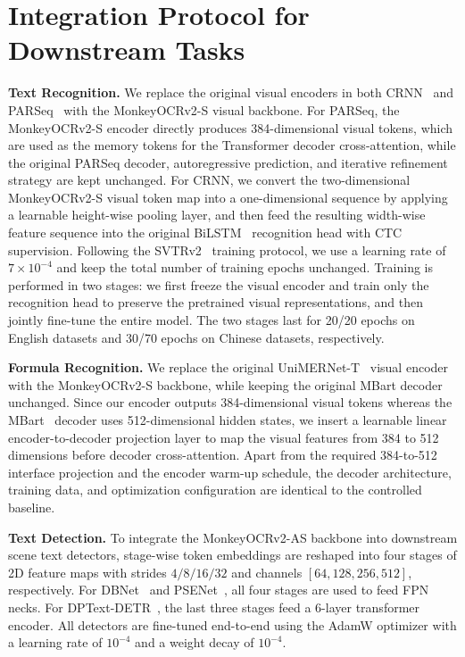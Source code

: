 \documentclass{article}
\begin{document}
\section{Integration Protocol for Downstream Tasks}
\label{sec:appendix_integration}
\textbf{Text Recognition.} We replace the original visual encoders in both CRNN~\cite{crnn} and PARSeq~\cite{parseq} with the MonkeyOCRv2-S visual backbone. For PARSeq, the MonkeyOCRv2-S encoder directly produces 384-dimensional visual tokens, which are used as the memory tokens for the Transformer decoder cross-attention, while the original PARSeq decoder, autoregressive prediction, and iterative refinement strategy are kept unchanged. For CRNN, we convert the two-dimensional MonkeyOCRv2-S visual token map into a one-dimensional sequence by applying a learnable height-wise pooling layer, and then feed the resulting width-wise feature sequence into the original BiLSTM~\cite{bilstm} recognition head with CTC~\cite{ctc} supervision. 
Following the SVTRv2~\cite{svtrv2} training protocol, we use a learning rate of $7\times10^{-4}$ and keep the total number of training epochs unchanged. Training is performed in two stages: we first freeze the visual encoder and train only the recognition head to preserve the pretrained visual representations, and then jointly fine-tune the entire model. The two stages last for 20/20 epochs on English datasets and 30/70 epochs on Chinese datasets, respectively.


\textbf{Formula Recognition.} 
We replace the original UniMERNet-T~\cite{unimernet} visual encoder with the MonkeyOCRv2-S backbone, while keeping the original MBart decoder unchanged. Since our encoder outputs 384-dimensional visual tokens whereas the MBart~\cite{mbart} decoder uses 512-dimensional hidden
states, we insert a learnable linear encoder-to-decoder projection layer to map the visual features from 384 to 512 dimensions before decoder cross-attention. 
Apart from the required 384-to-512 interface projection and the encoder warm-up schedule, the decoder architecture, training data, and optimization configuration are identical to the controlled baseline.

\textbf{Text Detection.} To integrate the MonkeyOCRv2-AS backbone into downstream scene text detectors, stage-wise token embeddings are reshaped into four stages of 2D feature maps with strides $4/8/16/32$ and channels $[64, 128, 256, 512]$, respectively. For DBNet~\cite{dbnet} and PSENet~\cite{wang2019shape}, all four stages are used to feed FPN necks. For DPText-DETR~\cite{dptextdetr}, the last three stages feed a 6-layer transformer encoder. All detectors are fine-tuned end-to-end using the AdamW optimizer with a learning rate of $10^{-4}$ and a weight decay of $10^{-4}$.
\end{document}
